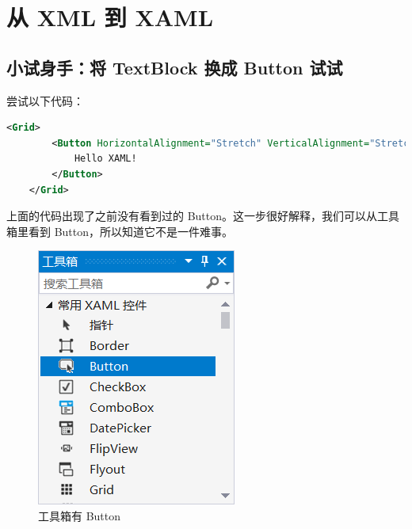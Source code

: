 




\section{从 XML 到 XAML}

\subsection{小试身手：将 TextBlock 换成 Button 试试}

尝试以下代码：
\begin{lstlisting}[language = xml]
    <Grid>
        <Button HorizontalAlignment="Stretch" VerticalAlignment="Stretch" FontSize="72">
            Hello XAML!
        </Button>
    </Grid>
\end{lstlisting}

上面的代码出现了之前没有看到过的 Button。这一步很好解释，我们可以从工具箱里看到 Button，所以知道它不是一件难事。
\begin{figure}[htbp]
    \centering
    \includegraphics[width = 0.25\paperwidth]{pic/16.png}
    \caption{工具箱有 Button}
\end{figure}

